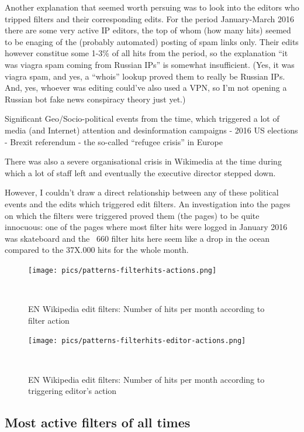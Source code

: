 Another explanation that seemed worth persuing was to look into the editors who tripped filters and their corresponding edits.
For the period January-March 2016 there are some very active IP editors, the top of whom (how many hits) seemed to be enaging of the (probably automated) posting of spam links only.
Their edits however constitue some 1-3\% of all hits from the period, so the explanation ``it was viagra spam coming from Russian IPs'' is somewhat insufficient.
(Yes, it was viagra spam, and yes, a ``whois'' lookup proved them to really be Russian IPs.
And, yes, whoever was editing could've also used a VPN, so I'm not opening a Russian bot fake news conspiracy theory just yet.)


Significant Geo/Socio-political events from the time, which triggered a lot of media (and Internet) attention and desinformation campaigns
- 2016 US elections
- Brexit referendum
- the so-called ``refugee crisis'' in Europe

There was also a severe organisational crisis in Wikimedia at the time during which a lot of staff left and eventually the executive director stepped down.


However, I couldn't draw a direct relationship between any of these political events and the edits which triggered edit filters.
An investigation into the pages on which the filters were triggered proved them (the pages) to be quite innocuous:
one of the pages where most filter hits were logged in January 2016 was skateboard and the ~660 filter hits here seem like a drop in the ocean compared to the 37X.000 hits for the whole month.

\begin{figure}
\centering
  \texttt{[image: pics/patterns-filterhits-actions.png]}
  \caption{EN Wikipedia edit filters: Number of hits per month according to filter action}~\label{fig:filter-hits-actions}
\end{figure}

\begin{figure}
\centering
  \texttt{[image: pics/patterns-filterhits-editor-actions.png]}
  \caption{EN Wikipedia edit filters: Number of hits per month according to triggering editor's action}~\label{fig:filter-hits-editors-actions}
\end{figure}

\subsection{Most active filters of all times}

